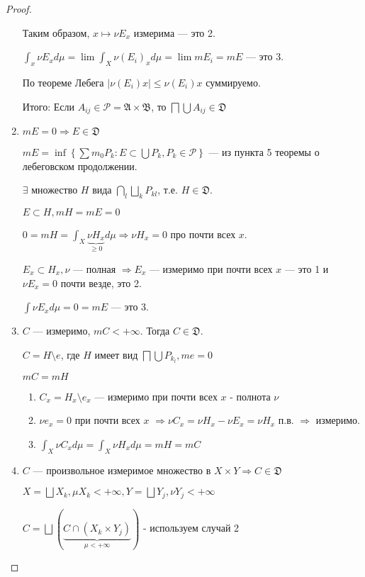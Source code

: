 \begin{proof}
\begin{enumerate}
              Таким образом, \(x \mapsto \nu E_x\) измерима --- это 2.

              \(\int_x \nu E_x d\mu = \lim \int_X \nu(E_i)_x d\mu = \lim m E_i = m E\) --- это 3.

              По теореме Лебега %
              \(|\nu(E_i) x| \leq \nu(E_i)x\) суммируемо.

              Итого: Если \(A_{ij}\in \mathcal{P}  = \mathfrak{A} \times \mathfrak{B}\), то \(\bigsqcap \bigcup A_{ij} \in \mathfrak{D}\)

        \item \(m E = 0 \Rightarrow E \in \mathfrak{D}\)

              \(m E = \inf \left\{\sum m_0 P_k : E \subset \bigcup P_k, P_k \in \mathcal{P}\right\} \) --- из пункта 5 теоремы о лебеговском продолжении.

              \(\exists \) множество \(H\) вида \(\bigcap_l \bigsqcup_k P_{kl}\), т.е. \(H\in \mathfrak{D}\).

              \(E\subset H, m H = m E = 0\)

              \(0 = mH = \int_X \underbrace{\nu H_x}_{ \geq 0} d\mu \Rightarrow \nu H_x = 0\) про почти всех \(x\).

              \(E_x \subset H_x, \nu\) --- полная \( \Rightarrow E_x\) --- измеримо при почти всех \(x\) --- это 1 и \(\nu E_x = 0\) почти везде, это 2.

              \(\int \nu E_x d\mu = 0 = m E\) --- это 3.

        \item \(C\) --- измеримо, \(mC < +\infty\). Тогда \(C\in \mathfrak{D}\).

              \(C = H \setminus e\), где \(H\) имеет вид \(\bigsqcap \bigcup P_{k_l}, me = 0\)

              \(mC = mH\)

              \begin{enumerate}
                  \item \(C_x = H_x \setminus e_x\) --- измеримо при почти всех \(x\) - полнота \(\nu\)
                  \item \(\nu e_x = 0\) при почти всех \(x\) \( \Rightarrow \nu C_x = \nu H_x - \nu E_x = \nu H_x\) п.в. \(\Rightarrow \) измеримо.
                  \item \(\int_X \nu C_x d\mu = \int_X \nu H_x d\mu = mH = mC\)
              \end{enumerate}

        \item \(C\) --- произвольное измеримое множество в \(X \times Y \Rightarrow C \in \mathfrak{D}\)

              \(X = \bigsqcup X_k, \mu X_k < +\infty, Y = \bigsqcup Y_j, \nu Y_j < +\infty\)

              \(C = \bigsqcup (\underbrace{C \cap (X_k \times Y_j)}_{\mu < +\infty})\) - используем случай 2
    \end{enumerate}
\end{proof}

